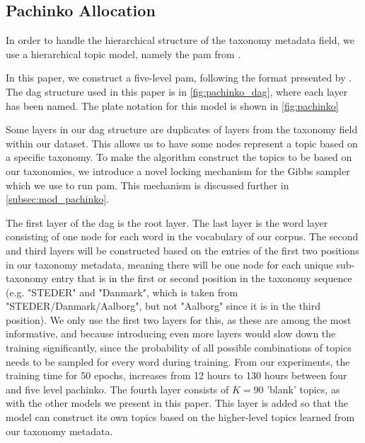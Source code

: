 \subsection{Pachinko Allocation}
In order to handle the hierarchical structure of the taxonomy metadata field, we use a hierarchical topic model, namely the \acrfull{pam} from \citet{li2006pachinko}.

In this paper, we construct a five-level \gls{pam}, following the format presented by \citet{li2006pachinko}.
The \gls{dag} structure used in this paper is in \autoref{fig:pachinko_dag}, where each layer has been named.
The plate notation for this model is shown in \autoref{fig:pachinko}

Some layers in our \gls{dag} structure are duplicates of layers from the taxonomy field within our dataset.
This allows us to have some nodes represent a topic based on a specific taxonomy.
To make the algorithm construct the topics to be based on our taxonomies, we introduce a novel locking mechanism for the Gibbs sampler which we use to run \gls{pam}.
This mechanism is discussed further in \autoref{subsec:mod_pachinko}.

The first layer of the \gls{dag} is the root layer.
The last layer is the word layer consisting of one node for each word in the vocabulary of our corpus.
The second and third layers will be constructed based on the entries of the first two positions in our taxonomy metadata, meaning there will be one node for each unique sub-taxonomy entry that is in the first or second position in the taxonomy sequence (e.g. "STEDER" and "Danmark", which is taken from "STEDER/Danmark/Aalborg", but not "Aalborg" since it is in the third position).
We only use the first two layers for this, as these are among the most informative, and because introducing even more layers would slow down the training significantly, since the probability of all possible combinations of topics needs to be sampled for every word during training.
From our experiments, the training time for 50 epochs, increases from 12 hours to 130 hours between four and five level pachinko.
The fourth layer consists of $K = 90$ 'blank' topics, as with the other models we present in this paper.
This layer is added so that the model can construct its own topics based on the higher-level topics learned from our taxonomy metadata.





